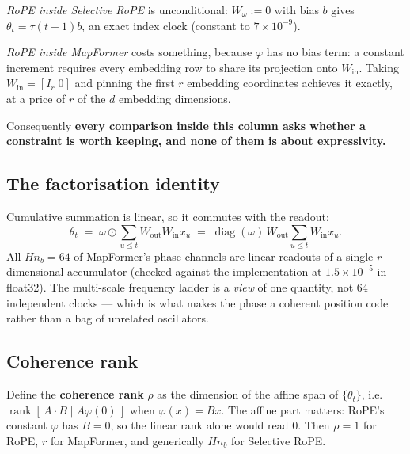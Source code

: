 \documentclass[11pt]{article}
\newcommand{\nb}{n_b}
\begin{document}
\medskip
\noindent\emph{RoPE inside Selective RoPE} is unconditional: $W_\omega := 0$ with
bias $b$ gives $\theta_t = \tau(t{+}1)b$, an exact index clock (constant to
$7\times10^{-9}$).

\medskip
\noindent\emph{RoPE inside MapFormer} costs something, because $\varphi$ has no bias
term: a constant increment requires every embedding row to share its projection onto
$W_{\mathrm{in}}$. Taking $W_{\mathrm{in}} = [I_r\;0]$ and pinning the first $r$
embedding coordinates achieves it exactly, at a price of $r$ of the $d$ embedding
dimensions.

\medskip
\noindent Consequently \textbf{every comparison inside this column asks whether a
constraint is worth keeping, and none of them is about expressivity.}

\subsection{The factorisation identity}

Cumulative summation is linear, so it commutes with the readout:
\begin{equation}
  \label{eq:factor}
  \theta_t \;=\; \omega \odot \textstyle\sum_{u \le t} W_{\mathrm{out}}W_{\mathrm{in}}x_u
  \;=\; \operatorname{diag}(\omega)\,W_{\mathrm{out}}
        \textstyle\sum_{u\le t} W_{\mathrm{in}}x_u .
\end{equation}
All $H\nb = 64$ of MapFormer's phase channels are linear readouts of a single
$r$-dimensional accumulator (checked against the implementation at
$1.5\times10^{-5}$ in float32). The multi-scale frequency ladder is a \emph{view} of
one quantity, not $64$ independent clocks --- which is what makes the phase a
coherent position code rather than a bag of unrelated oscillators.

\subsection{Coherence rank}
\label{sec:rank}

Define the \textbf{coherence rank} $\rho$ as the dimension of the affine span of
$\{\theta_t\}$, i.e.\ $\operatorname{rank}[\,A\!\cdot\!B \mid A\varphi(0)\,]$ when
$\varphi(x) = Bx$. The affine part matters: RoPE's constant $\varphi$ has $B=0$, so
the linear rank alone would read $0$. Then $\rho = 1$ for RoPE, $r$ for MapFormer,
and generically $H\nb$ for Selective RoPE.
\end{document}
